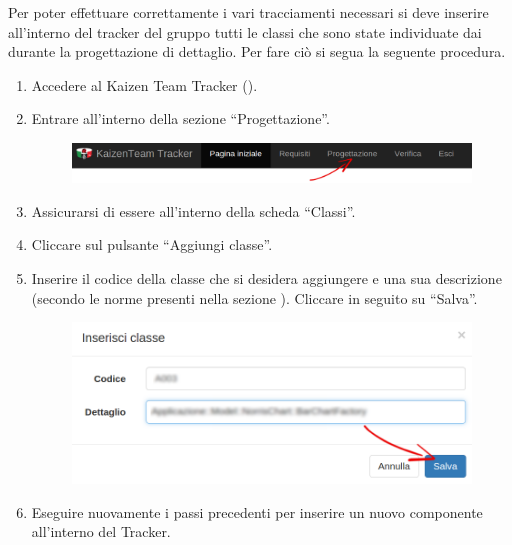 				 \label{sec:InsClasse}
					Per poter effettuare correttamente i vari tracciamenti necessari si deve inserire all'interno del tracker del gruppo tutti le classi che sono state individuate dai  durante la progettazione di dettaglio. Per fare ciò si segua la seguente procedura.
					\begin{enumerate}
						\item Accedere al Kaizen Team Tracker ().
						\item Entrare all'interno della sezione “Progettazione”.
						\begin{figure}[H]
							\centering
							\includegraphics[width=\textwidth]{Pics/HomePageMenuFrecciaProg}
						\end{figure}
						\item Assicurarsi di essere all'interno della scheda “Classi”.
						\item Cliccare sul pulsante “Aggiungi classe”.
						\item Inserire il codice della classe che si desidera aggiungere e una sua descrizione (secondo le norme presenti nella sezione ). Cliccare in seguito su “Salva”.
						\begin{figure}[H]
							\centering
							\includegraphics[width=\textwidth]{Pics/InserireClasse}
						\end{figure}
						\item Eseguire nuovamente i passi precedenti per inserire un nuovo componente all'interno del Tracker.
					\end{enumerate}

